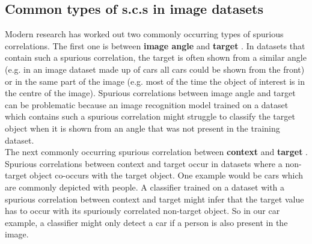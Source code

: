 \documentclass{article}
\begin{document}
\subsection{Common types of s.c.s in image datasets}
Modern research has worked out two commonly occurring types of spurious correlations. The first one is between \textbf{image angle} and \textbf{target} \cite{5995347}.
In datasets that contain such a spurious correlation, the target is often shown from a similar angle (e.g. in an image dataset made up of cars all cars
could be shown from the front) or in the same part of the image (e.g. most of the time the object of interest is in the centre of the image).
Spurious correlations between image angle and target can be problematic because an image recognition model trained on a dataset
which contains such a spurious correlation might struggle to classify the target object when it is shown from an angle that was not present in the training dataset. \\
The next commonly occurring spurious correlation between \textbf{context} and \textbf{target} \cite{Singh_2020_CVPR}.
Spurious correlations between context and target occur in datasets where a non-target object co-occurs with the target object.
One example would be cars which are commonly depicted with people. A classifier trained on a dataset with a spurious
correlation between context and target might infer that the target value has to occur with its spuriously correlated non-target
object. So in our car example, a classifier might only detect a car if a person is also present in the image.
\end{document}
